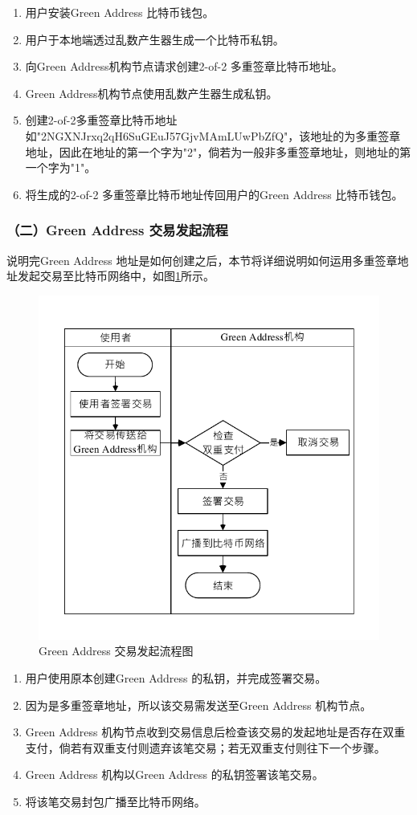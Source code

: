 			 	\begin{enumerate}
			 		\item 用户安装Green Address 比特币钱包。
			 		\item 用户于本地端透过乱数产生器生成一个比特币私钥。
			 		\item 向Green Address机构节点请求创建2-of-2 多重签章比特币地址。
			 		\item Green Address机构节点使用乱数产生器生成私钥。
					\item 创建2-of-2多重签章比特币地址如"2NGXNJrxq2qH6SuGEuJ57GjvMAmLUwPbZfQ"，该地址的为多重签章地址，因此在地址的第一个字为"2"，倘若为一般非多重签章地址，则地址的第一个字为"1"。
					\item 将生成的2-of-2 多重签章比特币地址传回用户的Green Address 比特币钱包。
			 	\end{enumerate}

			 	\subsubsection{（二）Green Address 交易发起流程}
			 	说明完Green Address 地址是如何创建之后，本节将详细说明如何运用多重签章地址发起交易至比特币网络中，如图\ref{gatx}所示。

			 	\begin{figure}[!htbp]
					\centering
					\includegraphics[width = .5\textwidth]{gatx.pdf}
					\caption{Green Address 交易发起流程图}\label{gatx}
				\end{figure}

				\begin{enumerate}
					\item 用户使用原本创建Green Address 的私钥，并完成签署交易。
					\item 因为是多重签章地址，所以该交易需发送至Green Address 机构节点。
					\item Green Address 机构节点收到交易信息后检查该交易的发起地址是否存在双重支付，倘若有双重支付则遗弃该笔交易；若无双重支付则往下一个步骤。
					\item Green Address 机构以Green Address 的私钥签署该笔交易。
					\item 将该笔交易封包广播至比特币网络。
				\end{enumerate}

